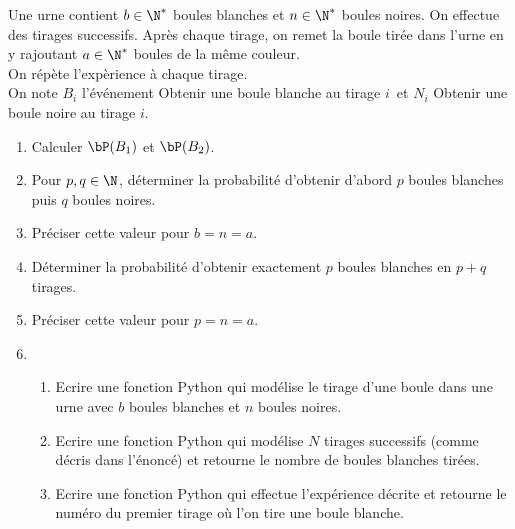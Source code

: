 



\begin{exercice}
Une urne contient $b\in \N^*$ boules blanches et $n\in \N^*$ boules noires. On effectue des tirages successifs. Après chaque tirage, on remet la boule tirée dans l'urne en y rajoutant $a\in \N^*$ boules de la même couleur. \\
On répète l'expèrience à chaque tirage. \\
On note $B_i$ l'événement \og Obtenir une boule blanche au tirage $i$\fg \, et $N_i$    \og Obtenir une boule noire au tirage $i$\fg.
\begin{enumerate}
\item Calculer $\bP(B_1)$ et $\bP(B_2)$.
\item Pour $p,q\in \N$, déterminer la probabilité d'obtenir d'abord $p$ boules blanches puis $q$ boules noires. 
\item Préciser cette valeur pour $b=n=a$. 
\item Déterminer la probabilité d'obtenir exactement $p$ boules blanches en $p+q$ tirages. 
\item Préciser cette valeur pour $p=n=a$. 
\item 
\begin{enumerate}
\item Ecrire une fonction Python qui modélise  le tirage d'une boule dans une urne avec $b$ boules blanches et $n$ boules noires.
\item Ecrire une fonction Python qui modélise $N$ tirages successifs (comme décris dans l'énoncé) et retourne le nombre de boules blanches tirées. 
\item Ecrire une fonction Python qui effectue l'expérience décrite et retourne le numéro du premier tirage où l'on tire une boule blanche. 
\end{enumerate}

\end{enumerate}
\end{exercice}

